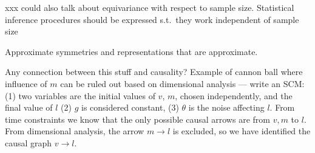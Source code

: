 \documentclass{article}
\renewcommand{\paragraph}[1]{\par\textbf{#1}~---~}
\begin{document}
xxx could also talk about equivariance with respect to sample size. Statistical inference procedures should be expressed s.t.\ they work independent of sample size

Approximate symmetries and representations that are approximate.

Any connection between this stuff and causality?
Example of cannon ball where influence of $m$ can be ruled out based on dimensional analysis --- write an SCM: (1) two variables are the initial values of $v$, $m$, chosen independently, and the final value of $l$ (2) $g$ is considered constant, (3) $\theta$ is the noise affecting $l$. From time constraints we know that the only possible causal arrows are from $v, m$ to $l$. From dimensional analysis, the arrow $m\to l$ is excluded, so we have identified the causal graph $v\to l$.



\raggedright

\end{document}
